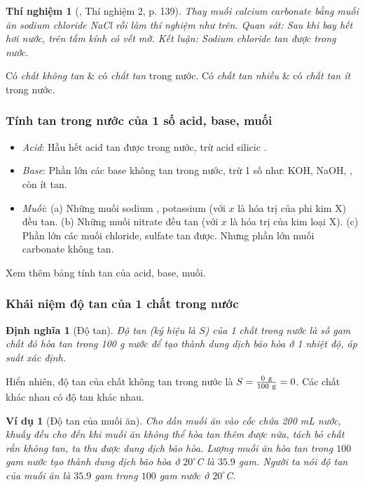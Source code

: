 \documentclass{article}
\newtheorem{dinhnghia}{Định nghĩa}
\newtheorem{thinghiem}{Thí nghiệm}
\newtheorem{vidu}{Ví dụ}
\begin{document}
\begin{thinghiem}[\cite{SGK_Hoa_Hoc_8}, Thí nghiệm 2, p. 139]
	Thay muối calcium carbonate bằng muối ăn sodium chloride \emph{NaCl} rồi làm thí nghiệm như trên. \emph{Quan sát:} Sau khi bay hết hơi nước, trên tấm kính có vết mờ. \emph{Kết luận:} Sodium chloride tan được trong nước.
\end{thinghiem}
Có \textit{chất không tan} \& có \textit{chất tan} trong nước. Có \textit{chất tan nhiều} \& có \textit{chất tan ít} trong nước.

\subsubsection{Tính tan trong nước của 1 số acid, base, muối}
\begin{itemize}
	\item \textit{Acid}: Hầu hết acid tan được trong nước, trừ acid silicic .
	\item \textit{Base}: Phần lớn các base không tan trong nước, trừ 1 số như: KOH, NaOH, , còn  ít tan.
	\item \textit{Muối}: (a) Những muối sodium , potassium  (với $x$ là hóa trị của phi kim X) đều tan. (b) Những muối nitrate  đều tan (với $x$ là hóa trị của kim loại X). (c) Phần lớn các muối chloride, sulfate tan được. Nhưng phần lớn muối carbonate không tan. 
\end{itemize}
Xem thêm bảng tính tan của acid, base, muối.

\subsubsection{Khái niệm độ tan của 1 chất trong nước}

\begin{dinhnghia}[Độ tan]
	\emph{Độ tan} (ký hiệu là $S$) của 1 chất trong nước là số gam chất đó hòa tan trong \emph{100 g} nước để tạo thành dung dịch bão hòa ở 1 nhiệt độ, áp suất xác định.
\end{dinhnghia}
Hiển nhiên, độ tan của chất không tan trong nước là $S = \frac{\rm0\ g}{\rm100\ g} = 0$. Các chất khác nhau có độ tan khác nhau.

\begin{vidu}[Độ tan của muối ăn]
	Cho dần muối ăn vào cốc chứa 200 mL nước, khuấy đều cho đến khi muối ăn không thể hòa tan thêm được nữa, tách bỏ chất rắn không tan, ta thu được dung dịch bão hòa. Lượng muối ăn hòa tan trong $100$ gam nước tạo thành dung dịch bão hòa ở $20^\circ$\emph{C} là $35.9$ gam. Người ta nói \emph{độ tan của muối ăn} là $35.9$ gam trong $100$ gam nước ở $20^\circ$\emph{C}.
\end{vidu}
\end{document}
